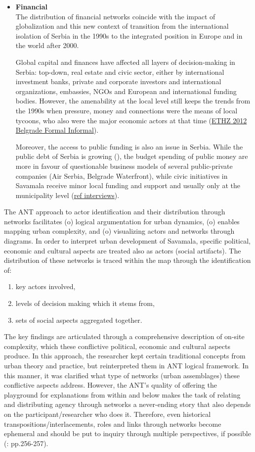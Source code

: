 \documentclass[11pt]{report}
\begin{document}
\begin{itemize}
\item \textbf{Financial}
\\
The distribution of financial networks coincide with the impact of globalization and this new context of transition from the international isolation of Serbia in the 1990s to the integrated position in Europe and in the world after 2000.

Global capital and finances have affected all layers of decision-making in Serbia: top-down, real estate and civic sector, either by international investment banks, private and corporate investors and international organizations, embassies, NGOs and European and international funding bodies.
However, the amenability at the local level still keeps the trends from the 1990s when pressure, money and connections were the means of local tycoons, who also were the major economic actors at that time (\href{}{ETHZ 2012 Belgrade Formal Informal}).

Moreover, the access to public funding is also an issue in Serbia.
While the public debt of Serbia is growing (\cite{Table RS}), the budget spending of public money are more in favour of questionable business models of several public-private companies (Air Serbia, Belgrade Waterfront), while civic initiatives in Savamala receive minor local funding and support and usually only at the municipality level (\href{}{ref interviews}).
\end{itemize}

The ANT approach to actor identification and their distribution through networks facilitates
(o) logical argumentation for urban dynamics,
(o) enables mapping urban complexity, and
(o) visualizing actors and networks through diagrams.
In order to interpret urban development of Savamala, specific political, economic and cultural aspects are treated also as actors (social artifacts).
The distribution of these networks is traced within the map through the identification of:

\begin{enumerate}
\item key actors involved,
\item levels of decision making which it stems from,
\item sets of social aspects aggregated together.
\end{enumerate}

The key findings are articulated through a comprehensive description of on-site complexity, which these conflictive political, economic and cultural aspects produce.
In this approach, the researcher kept certain traditional concepts from urban theory and practice, but reinterpreted them in ANT logical framework.
In this manner, it was clarified what type of networks (urban assemblages) these conflictive aspects address.
However, the ANT's quality of offering the playground for explanations from within and below makes the task of relating and distributing agency through networks a never-ending story that also depends on the participant/researcher who does it. Therefore, even historical transpositions/interlacements, roles and links through networks become ephemeral and should be put to inquiry through multiple perspectives, if possible (\cite{Latour 2005}: pp.256-257).
\end{document}
